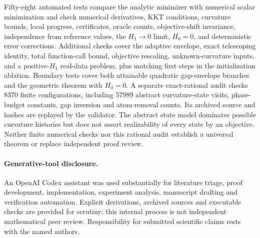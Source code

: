 \documentclass[11pt]{article}
\begin{document}
Fifty-eight automated tests compare the analytic minimizer with numerical
scalar minimization and check numerical derivatives, KKT conditions,
curvature bounds, local progress, certificates, oracle counts,
objective-shift invariance, independence from reference values, the
$H_1\to0$ limit, $H_0=0$, and deterministic error corrections.
Additional checks cover the adaptive envelope, exact telescoping identity,
total function-call bound, objective rescaling, unknown-curvature inputs,
and a positive-$H_1$ real-data problem, plus matching first steps in the
initialization ablation. Boundary tests cover both attainable quadratic
gap-envelope branches and the geometric theorem with $H_0=0$.
A separate exact-rational audit checks 8370 finite configurations,
including 57989 abstract curvature-state visits, phase-budget constants,
gap inversion and atom-removal counts. Its archived source and hashes
are replayed by the validator. The abstract state model dominates
possible curvature histories but does not assert realizability of
every state by an objective. Neither finite numerical checks nor this
rational audit establish a universal theorem or replace independent
proof review.

\paragraph{Generative-tool disclosure.}
An OpenAI Codex assistant was used substantially for literature triage,
proof development, implementation, experiment analysis, manuscript
drafting and verification automation. Explicit derivations, archived
sources and executable checks are provided for scrutiny; this internal
process is not independent mathematical peer review. Responsibility for
submitted scientific claims rests with the named authors.










\end{document}
